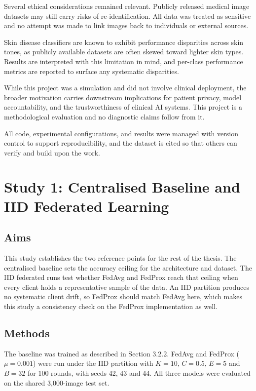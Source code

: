 \documentclass[12pt,openany,a4paper]{book}
\begin{document}
Several ethical considerations remained relevant. Publicly released medical image datasets may still carry risks of re-identification. All data was treated as sensitive and no attempt was made to link images back to individuals or external sources.

Skin disease classifiers are known to exhibit performance disparities across skin tones, as publicly available datasets are often skewed toward lighter skin types. Results are interpreted with this limitation in mind, and per-class performance metrics are reported to surface any systematic disparities.

While this project was a simulation and did not involve clinical deployment, the broader motivation carries downstream implications for patient privacy, model accountability, and the trustworthiness of clinical AI systems. This project is a methodological evaluation and no diagnostic claims follow from it.

All code, experimental configurations, and results were managed with version control to support reproducibility, and the dataset is cited so that others can verify and build upon the work.

\chapter{Study 1: Centralised Baseline and IID Federated Learning}

\section{Aims}
This study establishes the two reference points for the rest of the thesis. The centralised baseline sets the accuracy ceiling for the architecture and dataset. The IID federated runs test whether FedAvg and FedProx reach that ceiling when every client holds a representative sample of the data. An IID partition produces no systematic client drift, so FedProx should match FedAvg here, which makes this study a consistency check on the FedProx implementation as well.

\section{Methods}
The baseline was trained as described in Section 3.2.2. FedAvg and FedProx ($\mu = 0.001$) were run under the IID partition with $K = 10$, $C = 0.5$, $E = 5$ and $B = 32$ for 100 rounds, with seeds 42, 43 and 44. All three models were evaluated on the shared 3,000-image test set.
\end{document}
